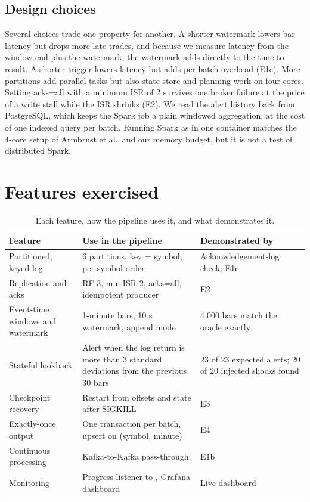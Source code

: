\subsection{Design choices}
Several choices trade one property for another. A shorter watermark lowers bar latency but drops more
late trades, and because we measure latency from the window end plus the watermark, the watermark
adds directly to the time to result. A shorter trigger lowers latency but adds per-batch overhead
(E1c). More partitions add parallel tasks but also state-store and planning work on four cores. Setting
acks=all with a minimum ISR of 2 survives one broker failure at the price of a write stall while the
ISR shrinks (E2). We read the alert history back from PostgreSQL, which keeps the Spark job a plain
windowed aggregation, at the cost of one indexed query per batch. Running Spark as  in one
container matches the 4-core setup of Armbrust et al.\ and our memory budget, but it is not a test of
distributed Spark.

\section{Features exercised}
\begin{table}[H]
\centering\small
\caption{Each feature, how the pipeline uses it, and what demonstrates it.}
\begin{tabularx}{\textwidth}{@{}>{\raggedright\arraybackslash}p{3.4cm}YY@{}}
\toprule
Feature & Use in the pipeline & Demonstrated by \\
\midrule
Partitioned, keyed log & 6 partitions, key = symbol, per-symbol order & Acknowledgement-log check; E1c \\
Replication and acks & RF 3, min ISR 2, acks=all, idempotent producer & E2 \\
Event-time windows and watermark & 1-minute bars, 10 s watermark, append mode & 4,000 bars match the oracle exactly \\
Stateful lookback & Alert when the log return is more than 3 standard deviations from the previous 30 bars & 23 of 23 expected alerts; 20 of 20 injected shocks found \\
Checkpoint recovery & Restart from offsets and state after SIGKILL & E3 \\
Exactly-once output & One transaction per batch, upsert on (symbol, minute) & E4 \\
Continuous processing & Kafka-to-Kafka pass-through & E1b \\
Monitoring & Progress listener to , Grafana dashboard & Live dashboard \\
\bottomrule
\end{tabularx}
\end{table}

